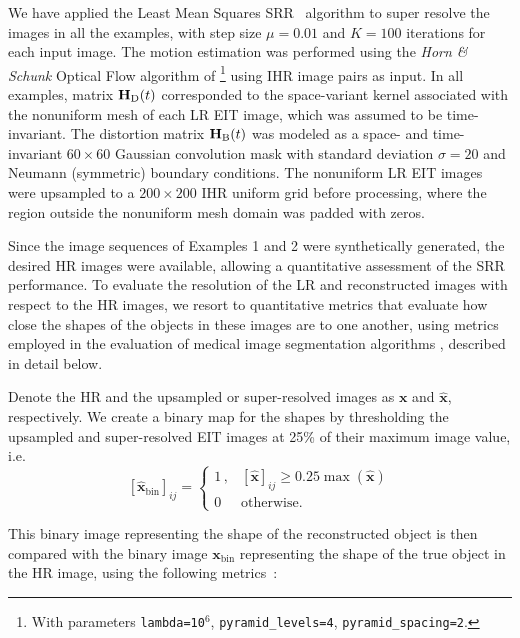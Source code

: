 \documentclass[10pt]{IEEEtran}
\newcommand{\cred}{}
\newcommand{\vx}{\mathbf{x}}
\newcommand{\vxh}{\hat{\mathbf{x}}}
\newcommand{\mH}{\mathbf{H}}
\begin{document}
We have applied the Least Mean Squares SRR~\cite{Elad99} algorithm to super resolve the images in all the examples, with step size $\mu=0.01$ and $K=100$ iterations for each input image.
%
The motion estimation was performed using the \textit{Horn \& Schunk} Optical Flow algorithm of \cite{Sun10}\footnote{With parameters { \texttt{lambda=10$^6$}, \texttt{pyramid\_levels=4}, \texttt{pyramid\_spacing=2}}.} using IHR image pairs as input.
%
In all examples, matrix $\mH_{\tiny{\text{D}}}(t)$ corresponded to the space-variant kernel associated with the nonuniform mesh of each LR EIT image, which was assumed to be time-invariant. The distortion matrix $\mH_{\tiny{\text{B}}}(t)$ was modeled as a space- and time-invariant $60\times60$ Gaussian convolution mask with standard deviation $\sigma=20$ and Neumann (symmetric) boundary conditions. The nonuniform LR EIT images were upsampled to a $200\times200$ IHR uniform grid before processing, where the region outside the nonuniform mesh domain was padded with zeros.












Since the image sequences of Examples 1 and 2 were synthetically generated, the desired HR images were available, allowing a quantitative assessment of the SRR performance.
%
To evaluate the resolution of the LR and reconstructed images with respect to the HR images, we resort to quantitative metrics that evaluate how close the shapes of the objects in these images are to one another, using metrics employed in the evaluation of medical image segmentation algorithms \cite{sluimer2005lungCTsegmentation,gerig2001validationSegmentation}, described in detail below.


Denote the HR and the upsampled or super-resolved images as $\vx$ and $\vxh$, respectively.
%
We create a binary map for the shapes by thresholding the upsampled and super-resolved EIT images at 25\% of their maximum image value, i.e.
\[[\vxh_{\text{bin}}]_{ij} = 
\left\{\begin{array}{cc}
    1\,, & [\vxh]_{ij} \geq 0.25 \max(\vxh) \\
    0 & \text{otherwise.}
\end{array}\right.\]

This binary image representing the shape of the reconstructed object is then compared with the binary image $\vx_{\text{bin}}$ representing the shape of the true object in the HR image, using the following metrics~\cite{sluimer2005lungCTsegmentation,gerig2001validationSegmentation}:
\end{document}
